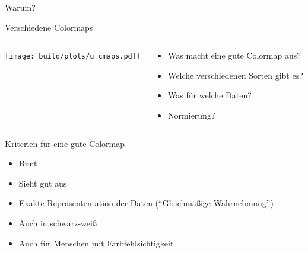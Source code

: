 \documentclass[aspectratio=1610, 9pt]{beamer}
\begin{document}
\begin{frame}[t]{Warum?}
\end{frame}

\begin{frame}[t]{Verschiedene Colormaps}
  \begin{columns}[onlytextwidth]%
    \begin{column}{0.52\textwidth}%
      \texttt{[image: build/plots/u\_cmaps.pdf]}
    \end{column}%
    \hfill%
    \begin{column}{0.47\textwidth}%
      \begin{itemize}
        \item Was macht eine gute Colormap aus?
        \item Welche verschiedenen Sorten gibt es?
        \item Was für welche Daten?
        \item Normierung?
      \end{itemize}
    \end{column}%
  \end{columns}%
\end{frame}

\begin{frame}{Kriterien für eine gute Colormap}
  \begin{itemize}
    \item Bunt
    \item Sieht gut aus\\[2\baselineskip]
    \item Exakte Repräsententation der Daten (\enquote{Gleichmäßige Wahrnehmung})
    \item Auch in schwarz-weiß 
    \item Auch für Menschen mit Farbfehlsichtigkeit
  \end{itemize}
\end{frame}
\end{document}
